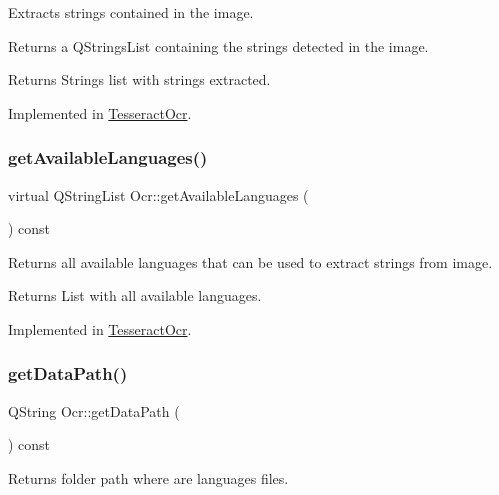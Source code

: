 Extracts strings contained in the image. 

Returns a Q\+Strings\+List containing the strings detected in the image. \begin{DoxyReturn}{Returns}
Strings list with strings extracted. 
\end{DoxyReturn}


Implemented in \mbox{\hyperlink{classTesseractOcr_a7e5a1d3e275f710ce187bc1c0b080327}{Tesseract\+Ocr}}.

\mbox{\label{classOcr_a1b0eed20f8e7f553401834849d044bd2}} 
\subsubsection{\texorpdfstring{get\+Available\+Languages()}{getAvailableLanguages()}}
{\footnotesize\ttfamily virtual Q\+String\+List Ocr\+::get\+Available\+Languages (\begin{DoxyParamCaption}{ }\end{DoxyParamCaption}) const\hspace{0.3cm}{\ttfamily [pure virtual]}}



Returns all available languages that can be used to extract strings from image. 

\begin{DoxyReturn}{Returns}
List with all available languages. 
\end{DoxyReturn}


Implemented in \mbox{\hyperlink{classTesseractOcr_ad3486dcaa8a478c72ebaf76c43671326}{Tesseract\+Ocr}}.

\mbox{\label{classOcr_a44f623335f8c26cc956b549a7bbf75fe}} 
\subsubsection{\texorpdfstring{get\+Data\+Path()}{getDataPath()}}
{\footnotesize\ttfamily Q\+String Ocr\+::get\+Data\+Path (\begin{DoxyParamCaption}{ }\end{DoxyParamCaption}) const}



Returns folder path where are languages files. 

